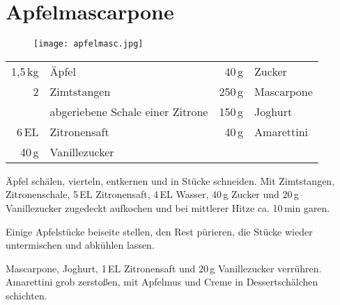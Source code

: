 \section*{Apfelmascarpone}
\begin{figure}[H]
  \centering
  \texttt{[image: apfelmasc.jpg]}
\end{figure}
\begin{centering}
\end{centering}
\begin{table}[H]
\centering
\begin{tabular*}{1\textwidth}{rlrl}
1,5\,kg & \"{A}pfel & 40\,g & Zucker \\
2 & Zimtstangen & 250\,g & Mascarpone \\
& abgeriebene Schale einer Zitrone & 150\,g & Joghurt \\
6\,EL & Zitronensaft & 40\,g & Amarettini \\
40\,g & Vanillezucker & & \\
\end{tabular*}
\end{table}
\begin{Notes}

\item \"{A}pfel sch\"{a}len, vierteln, entkernen und in St\"{u}cke schneiden. Mit Zimtstangen, Zitronenschale, 5\,EL Zitronensaft, 4\,EL Wasser, 40\,g Zucker und 20\,g Vanillezucker zugedeckt aufkochen und bei mittlerer Hitze ca. 10\,min garen.

\item Einige Apfelst\"{u}cke beiseite stellen, den Rest p\"{u}rieren, die St\"{u}cke wieder untermischen und abk\"{u}hlen lassen.

\item Mascarpone, Joghurt, 1\,EL Zitronensaft und 20\,g Vanillezucker verrühren. Amarettini grob zerstoßen, mit Apfelmus und Creme in Dessertschälchen schichten.

\end{Notes}
\newpage
